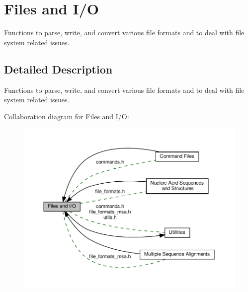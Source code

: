 \hypertarget{group__file__utils}{}\section{Files and I/O}
\label{group__file__utils}


Functions to parse, write, and convert various file formats and to deal with file system related issues.  




\subsection{Detailed Description}
Functions to parse, write, and convert various file formats and to deal with file system related issues. 

Collaboration diagram for Files and I/O\+:
\nopagebreak
\begin{figure}[H]
\begin{center}
\leavevmode
\includegraphics[width=350pt]{group__file__utils}
\end{center}
\end{figure}
